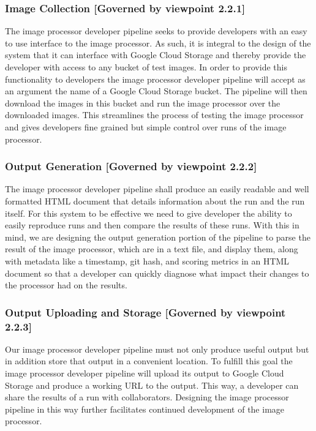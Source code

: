 \documentclass[10pt, onecolumn, draftclsnofoot, letterpaper, compsoc]{IEEEtran}
\begin{document}
    \subsubsection{Image Collection [Governed by viewpoint 2.2.1]}
    The image processor developer pipeline seeks to provide developers with an
    easy to use interface to the image processor. As such, it is integral to the
    design of the system that it can interface with Google Cloud Storage and
    thereby provide the developer with access to any bucket of test images. In
    order to provide this functionality to developers the image processor
    developer pipeline will accept as an argument the name of a Google Cloud
    Storage bucket. The pipeline will then download the images in this bucket
    and run the image processor over the downloaded images. This streamlines the
    process of testing the image processor and gives developers fine grained but
    simple control over runs of the image processor.  \\

    \subsubsection{Output Generation [Governed by viewpoint 2.2.2]}
    The image processor developer pipeline shall produce an easily readable and
    well formatted HTML document that details information about the run and the
    run itself. For this system to be effective we need to give developer the
    ability to easily reproduce runs and then compare the results of these
    runs. With this in mind, we are designing the output generation portion of
    the pipeline to parse the result of the image processor, which are in a text
    file, and display them, along with metadata like a timestamp, git hash, and
    scoring metrics in an HTML document so that a developer can quickly diagnose
    what impact their changes to the processor had on the results. \\

    \subsubsection{Output Uploading and Storage [Governed by viewpoint 2.2.3]}
    Our image processor developer pipeline must not only produce useful output
    but in addition store that output in a convenient location. To fulfill this
    goal the image processor developer pipeline will upload its output to
    Google Cloud Storage and produce a working URL to the output. This way, a
    developer can share the results of a run with collaborators. Designing the
    image processor pipeline in this way further facilitates continued
    development of the image processor. \\
\end{document}

